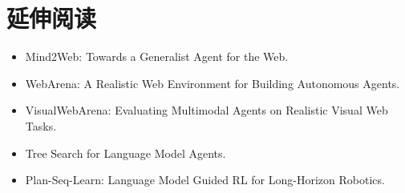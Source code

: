 \section{延伸阅读}
\begin{itemize}
\item Mind2Web: Towards a Generalist Agent for the Web.
\item WebArena: A Realistic Web Environment for Building Autonomous Agents.
\item VisualWebArena: Evaluating Multimodal Agents on Realistic Visual Web Tasks.
\item Tree Search for Language Model Agents.
\item Plan-Seq-Learn: Language Model Guided RL for Long-Horizon Robotics.
\end{itemize}
